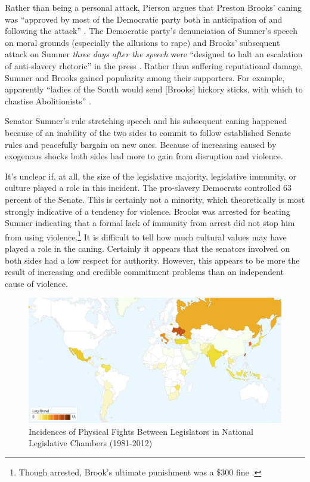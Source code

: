 \documentclass[a4paper]{article}\usepackage[]{graphicx}\usepackage[]{color}
\begin{document}
Rather than being a personal attack, Pierson argues that Preston Brooks' caning was ``approved by most of the Democratic party both in anticipation of and following the attack'' \cite[553]{Pierson1995}. The Democratic party's denunciation of Sumner's speech on moral grounds (especially the allusions to rape) and Brooks' subsequent attack on Sumner \emph{three days after the speech} were ``designed to halt an escalation of anti-slavery rhetoric'' in the press \cite[553]{Pierson1995}. Rather than suffering reputational damage, Sumner and Brooks gained popularity among their supporters. For example, apparently ``ladies of the South would send [Brooks] hickory sticks, with which to chastise Abolitionists'' \cite[255]{Donald2009}.

Senator Sumner's rule stretching speech and his subsequent caning happened because of an inability of the two sides to commit to follow established Senate rules and peacefully bargain on new ones. Because of increasing  caused by exogenous shocks both sides had more to gain from disruption and violence.

It's unclear if, at all, the size of the legislative majority, legislative immunity, or culture played a role in this incident. The pro-slavery Democrats controlled 63 percent of the Senate. This is certainly not a minority, which theoretically is most strongly indicative of a tendency for violence. Brooks was arrested for beating Sumner indicating that a formal lack of immunity from arrest did not stop him from using violence.\footnote{Though arrested, Brook's ultimate punishment was a \$300 fine \cite[59]{Wolfe2004}.} It is difficult to tell how much cultural values may have played a role in the caning. Certainly it appears that the senators involved on both sides had a low respect for authority. However, this appears to be more the result of increasing  and credible commitment problems than an independent cause of violence.

\begin{figure}[h!]
    \centering

        \includegraphics[width = 13cm]{incidence_map.png}

        \caption{Incidences of Physical Fights Between Legislators in  National Legislative Chambers (1981-2012)}
        \label{leg_map}

\end{figure}
\end{document}
